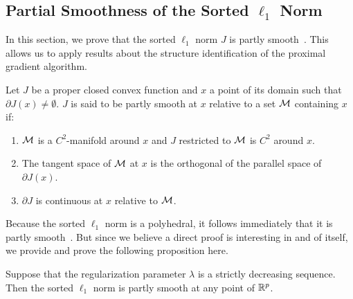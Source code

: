 \subsection{Partial Smoothness of the Sorted $\ell_1$ Norm}
\label{app:sec:partly_smooth}

In this section, we prove that the sorted $\ell_1$ norm $J$ is partly smooth~\parencite{lewis2002a}.
This allows us to apply results about the structure identification of the proximal gradient algorithm.

\begin{definition}
	Let $J$ be a proper closed convex function and $x$ a point of its domain such that $\partial J(x) \neq \emptyset$.
	$J$ is said to be partly smooth at $x$ relative to a set $\mathcal{M}$ containing $x$ if:
	\begin{enumerate}
		\item $\mathcal{M}$ is a $C^2$-manifold around $x$ and $J$ restricted to $\mathcal{M}$ is $C^2$ around $x$.
		\item The tangent space of $\mathcal{M}$ at $x$ is the orthogonal of the parallel space of $\partial J(x)$.
		\item $\partial J$ is continuous at $x$ relative to $\mathcal{M}$.
	\end{enumerate}
\end{definition}

Because the sorted \(\ell_1\) norm is a polyhedral, it follows immediately that it
is partly smooth~\parencite[Example 18]{vaiter2017}. But since we believe a direct
proof is interesting in and of itself, we provide and prove the following proposition here.

\begin{proposition}
	Suppose that the regularization parameter $\lambda$ is a strictly decreasing sequence. Then the sorted $\ell_1$ norm is partly smooth at any point of $\mathbb{R}^p$.
\end{proposition}

